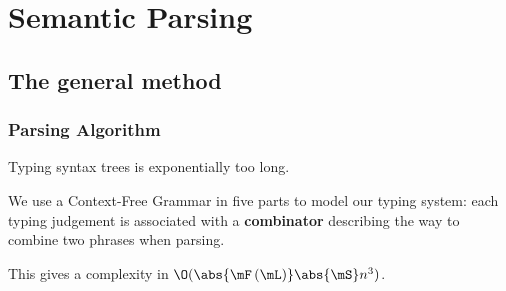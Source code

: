 \documentclass[math, english, info]{beamercours}
\begin{document}
\section{Semantic Parsing}
\subsection{The general method}
\begin{frame}
	\frametitle{Parsing Algorithm}
	Typing syntax trees is exponentially too long.

	\pause\medskip

	We use a Context-Free Grammar in five parts to model our typing system:
	each typing judgement is associated with a \textbf{combinator} describing the
	way to combine two phrases when parsing.

	\smallskip\pause

	This gives a complexity in $\O(\abs{\mF\left(\mL\right)}\abs{\mS}n^{3})$.
\end{frame}
\end{document}
